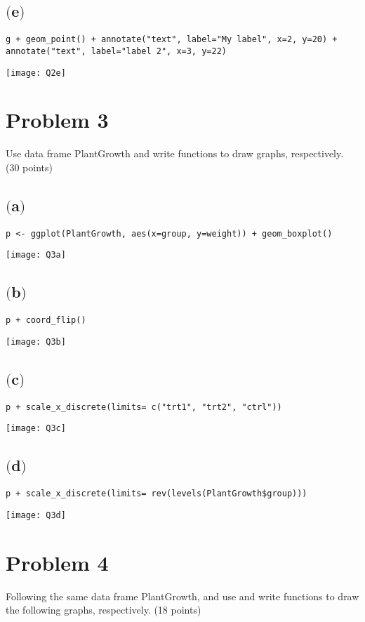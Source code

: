 \documentclass[a4paper,man,natbib]{apa6}
\begin{document}
\subsection{$($e$)$}
\begin{verbatim}
g + geom_point() + annotate("text", label="My label", x=2, y=20) + annotate("text", label="label 2", x=3, y=22)
\end{verbatim}
\texttt{[image: Q2e]}

\section{Problem 3}
Use data frame PlantGrowth and write functions to draw graphs, respectively. (30 points)

\subsection{$($a$)$}
\begin{verbatim}
p <- ggplot(PlantGrowth, aes(x=group, y=weight)) + geom_boxplot()
\end{verbatim}
\texttt{[image: Q3a]}

\subsection{$($b$)$}
\begin{verbatim}
p + coord_flip()
\end{verbatim}
\texttt{[image: Q3b]}

\pagebreak
\subsection{$($c$)$}
\begin{verbatim}
p + scale_x_discrete(limits= c("trt1", "trt2", "ctrl"))
\end{verbatim}
\texttt{[image: Q3c]}

\subsection{$($d$)$}
\begin{verbatim}
p + scale_x_discrete(limits= rev(levels(PlantGrowth$group)))
\end{verbatim}
\texttt{[image: Q3d]}

\pagebreak
\section{Problem 4}
Following the same data frame PlantGrowth, and use and write functions to draw the following graphs, respectively. (18 points)
\end{document}
